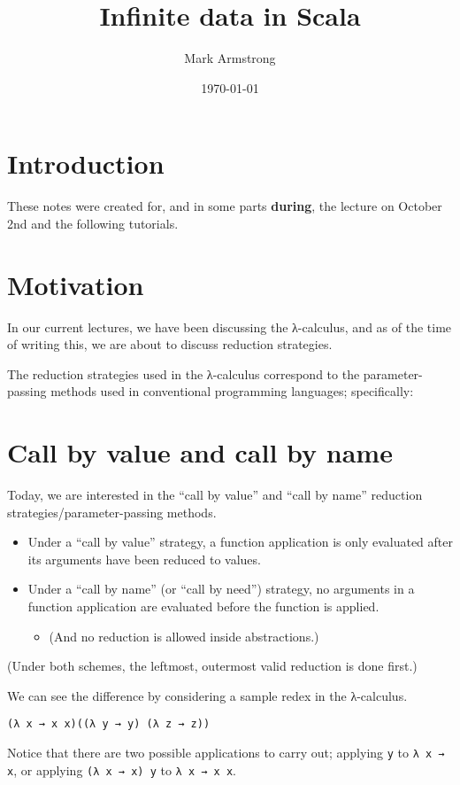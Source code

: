 \documentclass[11pt]{article}
\author{Mark Armstrong}
\date{\today}
\title{Infinite data in Scala}
\begin{document}
\maketitle
\tableofcontents


\section{Introduction}
\label{sec:orga6f503f}
These notes were created for, and in some parts \textbf{during},
the lecture on October 2nd and the following tutorials.

\section{Motivation}
\label{sec:org8865573}
In our current lectures, we have been discussing the λ-calculus,
and as of the time of writing this, we are about to discuss
reduction strategies.

The reduction strategies used in the λ-calculus
correspond to the parameter-passing methods
used in conventional programming languages; specifically:

\section{Call by value and call by name}
\label{sec:org11ed657}

Today, we are interested in the
“call by value” and “call by name”
reduction strategies/parameter-passing methods.
\begin{itemize}
\item Under a “call by value” strategy,
a function application is only evaluated after
its arguments have been reduced to values.
\item Under a “call by name” (or “call by need”) strategy,
no arguments in a function application are evaluated before
the function is applied.
\begin{itemize}
\item (And no reduction is allowed inside abstractions.)
\end{itemize}
\end{itemize}

(Under both schemes, the leftmost, outermost valid reduction is done first.)

We can see the difference by considering a sample redex
in the λ-calculus.
\begin{verbatim}
(λ x → x x)((λ y → y) (λ z → z))
\end{verbatim}
Notice that there are two possible applications to carry out;
applying \texttt{y} to \texttt{λ x → x}, or applying \texttt{(λ x → x) y} to \texttt{λ x → x x}.
\end{document}
